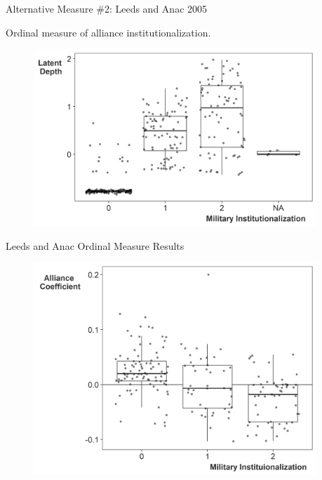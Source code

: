 \documentclass[12pt]{beamer}
\begin{document}


\begin{frame}{Alternative Measure \#2: Leeds and Anac 2005}

Ordinal measure of alliance institutionalization. 

\begin{figure}
	\centering
		\includegraphics[width=0.95\textwidth]{milinst-comp.png}
\end{figure}


\end{frame}



\begin{frame}{Leeds and Anac Ordinal Measure Results}

\begin{figure}
	\centering
		\includegraphics[width=0.95\textwidth]{milinst-lambda.png}
\end{figure}


\end{frame}
\end{document}
